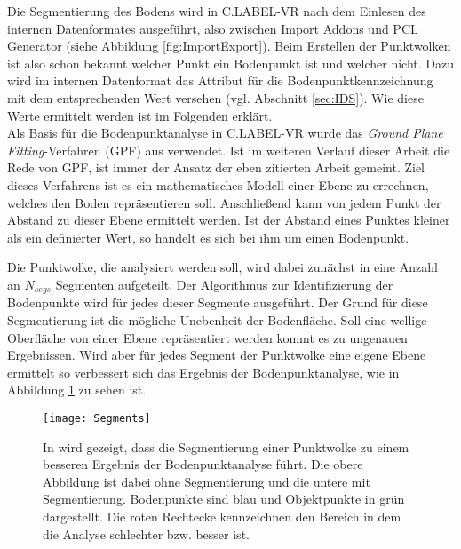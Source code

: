 Die Segmentierung des Bodens wird in C.LABEL-VR nach dem Einlesen des internen Datenformates ausgeführt, also zwischen Import Addons und PCL Generator (siehe Abbildung \ref{fig:ImportExport}). Beim Erstellen der Punktwolken ist also schon bekannt welcher Punkt ein Bodenpunkt ist und welcher nicht. Dazu wird im internen Datenformat das Attribut für die Bodenpunktkennzeichnung mit dem entsprechenden Wert versehen (vgl. Abschnitt \ref{sec:IDS}). Wie diese Werte ermittelt werden ist im Folgenden erklärt.\\

Als Basis für die Bodenpunktanalyse in C.LABEL-VR wurde das \textit{Ground Plane Fitting}-Verfahren (GPF) aus \cite{bib:Segmentation1} verwendet. Ist im weiteren Verlauf dieser Arbeit die Rede von GPF, ist immer der Ansatz der eben zitierten Arbeit gemeint. Ziel dieses Verfahrens ist es ein mathematisches Modell einer Ebene zu errechnen, welches den Boden repräsentieren soll. Anschließend kann von jedem Punkt der Abstand zu dieser Ebene ermittelt werden. Ist der Abstand eines Punktes kleiner als ein definierter Wert, so handelt es sich bei ihm um einen Bodenpunkt.

Die Punktwolke, die analysiert werden soll, wird dabei zunächst in eine Anzahl an $N_{segs}$ Segmenten aufgeteilt. Der Algorithmus zur Identifizierung der Bodenpunkte wird für jedes dieser Segmente ausgeführt. Der Grund für diese Segmentierung ist die mögliche Unebenheit der Bodenfläche. Soll eine wellige Oberfläche von einer Ebene repräsentiert werden kommt es zu ungenauen Ergebnissen. Wird aber für jedes Segment der Punktwolke eine eigene Ebene ermittelt so verbessert sich das Ergebnis der Bodenpunktanalyse, wie in Abbildung \ref{fig:Segments} zu sehen ist.

\begin{figure}%
	\centering
    \texttt{[image: Segments]}
    \caption{In \cite{bib:Segmentation1} wird gezeigt, dass die Segmentierung einer Punktwolke zu einem besseren Ergebnis der Bodenpunktanalyse führt. Die obere Abbildung ist dabei ohne Segmentierung und die untere mit Segmentierung. Bodenpunkte sind blau und Objektpunkte in grün dargestellt. Die roten Rechtecke kennzeichnen den Bereich in dem die Analyse schlechter bzw. besser ist.}
    \label{fig:Segments}
\end{figure}

